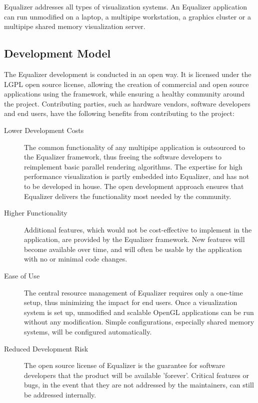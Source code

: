 \documentclass[10pt,a4paper]{scrartcl}
\begin{document}
Equalizer addresses all types of visualization systems. An Equalizer
application can run unmodified on a laptop, a multipipe workstation, a
graphics cluster or a multipipe shared memory visualization server.

\subsection{Development Model}

The Equalizer development is conducted in an open way. It is licensed
under the LGPL open source license, allowing the creation of commercial
and open source applications using the framework, while ensuring a
healthy community around the project. Contributing parties, such as
hardware vendors, software developers and end users, have the following
benefits from contributing to the project:

\begin{description}
\item[Lower Development Costs] The common functionality of any multipipe
  application is outsourced to the Equalizer framework, thus freeing the
  software developers to reimplement basic parallel rendering
  algorithms. The expertise for high performance visualization is partly
  embedded into Equalizer, and has not to be developed in house. The
  open development approach ensures that Equalizer delivers the
  functionality most needed by the community.
\item[Higher Functionality] Additional features, which would not be
  cost-effective to implement in the application, are provided by the
  Equalizer framework. New features will become available over time, and
  will often be usable by the application with no or minimal code
  changes.
\item[Ease of Use] The central resource management of Equalizer requires
  only a one-time setup, thus minimizing the impact for end users. Once
  a visualization system is set up, unmodified and scalable OpenGL
  applications can be run without any modification. Simple
  configurations, especially shared memory systems, will be configured
  automatically.
\item[Reduced Development Risk] The open source license of Equalizer is
  the guarantee for software developers that the product will be
  available 'forever'. Critical features or bugs, in the event that they
  are not addressed by the maintainers, can still be addressed
  internally.
\end{description}
\end{document}
